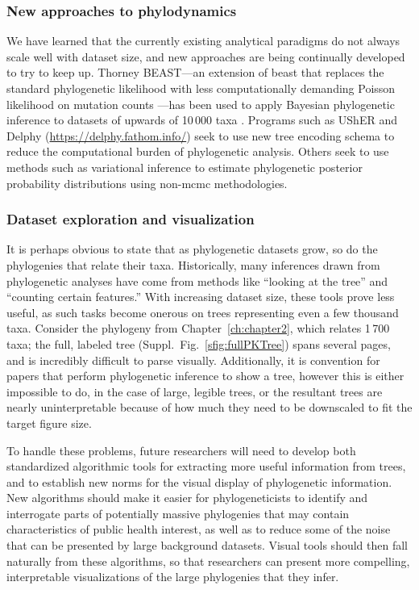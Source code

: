 \subsubsection{New approaches to phylodynamics}
We have learned that the currently existing analytical paradigms do not always scale well with dataset size, and new approaches are being continually developed to try to keep up.
Thorney BEAST---an extension of \gls{beast} that replaces the standard phylogenetic likelihood with less computationally demanding Poisson likelihood on mutation counts \citep{thorne1998estimating}---has been used to apply Bayesian phylogenetic inference to datasets of upwards of 10\,000 taxa \citep{du2021establishment}.
Programs such as UShER \citep{turakhia2021ultrafast} and Delphy (\url{https://delphy.fathom.info/}) seek to use new tree encoding schema to reduce the computational burden of phylogenetic analysis.
Others seek to use methods such as variational inference \citep{zhang2019variational} to estimate phylogenetic posterior probability distributions using non-\gls{mcmc} methodologies.

\subsubsection{Dataset exploration and visualization}
It is perhaps obvious to state that as phylogenetic datasets grow, so do the phylogenies that relate their taxa.
Historically, many inferences drawn from phylogenetic analyses have come from methods like ``looking at the tree'' and ``counting certain features.''
With increasing dataset size, these tools prove less useful, as such tasks become onerous on trees representing even a few thousand taxa.
Consider the phylogeny from Chapter~\ref{ch:chapter2}, which relates 1\,700 taxa; the full, labeled tree (Suppl.~Fig.~\ref{sfig:fullPKTree}) spans several pages, and is incredibly difficult to parse visually.
Additionally, it is convention for papers that perform phylogenetic inference to show a tree, however this is either impossible to do, in the case of large, legible trees, or the resultant trees are nearly uninterpretable because of how much they need to be downscaled to fit the target figure size.

To handle these problems, future researchers will need to develop both standardized algorithmic tools for extracting more useful information from trees, and to establish new norms for the visual display of phylogenetic information.
New algorithms should make it easier for phylogeneticists to identify and interrogate parts of potentially massive phylogenies that may contain characteristics of public health interest, as well as to reduce some of the noise that can be presented by large background datasets.
Visual tools should then fall naturally from these algorithms, so that researchers can present more compelling, interpretable visualizations of the large phylogenies that they infer.

